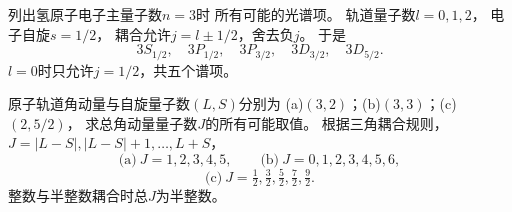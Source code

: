 列出氢原子电子主量子数$n=3$时
所有可能的光谱项。
\exsolution
轨道量子数$l=0,1,2$，
电子自旋$s=1/2$，
耦合允许$j=l\pm1/2$，舍去负$j$。
于是
\[
 \boxed{3S_{1/2},\quad3P_{1/2},\quad3P_{3/2},\quad
 3D_{3/2},\quad3D_{5/2}}.
\]
\excheck $l=0$时只允许$j=1/2$，共五个谱项。

原子轨道角动量与自旋量子数$(L,S)$分别为
(a)$(3,2)$；(b)$(3,3)$；(c)$(2,5/2)$，
求总角动量量子数$J$的所有可能取值。
\exsolution
根据三角耦合规则，
$J=|L-S|,|L-S|+1,\ldots,L+S$，
\[
 \boxed{\text{(a)}\ J=1,2,3,4,5},
 \qquad
 \boxed{\text{(b)}\ J=0,1,2,3,4,5,6},
\]
\[
 \boxed{\text{(c)}\ J=\tfrac12,\tfrac32,\tfrac52,\tfrac72,\tfrac92}.
\]
\excheck 整数与半整数耦合时总$J$为半整数。
